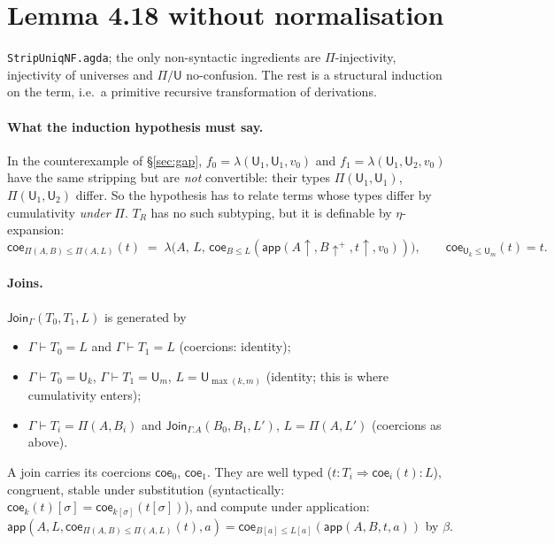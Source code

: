 \documentclass[10pt]{article}
\newcommand{\U}{\mathsf{U}}
\newcommand{\lam}{\lambda}
\newcommand{\app}{\mathsf{app}}
\newcommand{\TR}{T_R}
\newcommand{\agda}[1]{\texttt{#1}}
\theoremstyle{remark}
\begin{document}
\section{Lemma 4.18 without normalisation}\label{sec:nf}

\agda{StripUniqNF.agda}; the only non-syntactic ingredients are
$\Pi$-injectivity, injectivity of universes and $\Pi/\U$ no-confusion.
The rest is a structural induction on the term, i.e.\ a primitive recursive
transformation of derivations.

\paragraph{What the induction hypothesis must say.}  In the counterexample
of \S\ref{sec:gap}, $f_0=\lam(\U_1,\U_1,v_0)$ and $f_1=\lam(\U_1,\U_2,v_0)$
have the same stripping but are \emph{not} convertible: their types
$\Pi(\U_1,\U_1)$, $\Pi(\U_1,\U_2)$ differ.  So the hypothesis has to relate
terms whose types differ by cumulativity \emph{under} $\Pi$.  $\TR$ has no
such subtyping, but it is definable by $\eta$-expansion:
\[
\mathsf{coe}_{\Pi(A,B)\le\Pi(A,L)}(t) \;=\;
\lam\bigl(A,\,L,\,\mathsf{coe}_{B\le L}(\app(A{\uparrow},B{\uparrow^+},t{\uparrow},v_0))\bigr),
\qquad \mathsf{coe}_{\U_k\le\U_m}(t)=t .
\]
\paragraph{Joins.}  $\mathsf{Join}_\Gamma(T_0,T_1,L)$ is generated by
\begin{itemize}
\item $\Gamma\vdash T_0=L$ and $\Gamma\vdash T_1=L$ (coercions: identity);
\item $\Gamma\vdash T_0=\U_k$, $\Gamma\vdash T_1=\U_m$, $L=\U_{\max(k,m)}$
  (identity; this is where cumulativity enters);
\item $\Gamma\vdash T_i=\Pi(A,B_i)$ and $\mathsf{Join}_{\Gamma.A}(B_0,B_1,L')$,
  $L=\Pi(A,L')$ (coercions as above).
\end{itemize}
A join carries its coercions $\mathsf{coe}_0$, $\mathsf{coe}_1$.  They are
well typed ($t:T_i\Rightarrow\mathsf{coe}_i(t):L$), congruent, stable
under substitution (syntactically: $\mathsf{coe}_k(t)[\sigma]=
\mathsf{coe}_{k[\sigma]}(t[\sigma])$), and compute under application:
$\app(A,L,\mathsf{coe}_{\Pi(A,B)\le\Pi(A,L)}(t),a)=\mathsf{coe}_{B[a]\le L[a]}(\app(A,B,t,a))$ by $\beta$.
\end{document}
